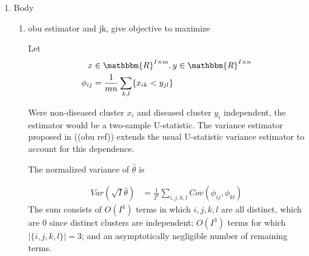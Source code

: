 \documentclass{article}
\newcommand{\V}{Var}
\newcommand{\cov}{Cov}
\newcommand{\I}{I}
\begin{document}
\begin{enumerate}
  ((obu ref)) presents an estimator of the variance of ((ref pop auc))
  enabling inferences to be drawn. Alternative estimators of the
  variance are resampling methods such as the bootstrap and the
  jackknife. Fig (()) presents a comparison of ((obu estimator)) and
  jackknife estimator using synthetic multivariate normal data. The
  two estimates are nearly identical. Fig (()) suggests that the
  difference of the two variance estimates is somewhere between
  $O(1/\I^2)$ and $O(1/\I^{2.5})$.

  Below we establish that the difference between the two variance
  estiamtors is $O(1/\I^2)$. We also give an adversarial example
  achieving this bound. Inasmuch as the jackknife may be viewed as a
  linearization of the bootstrap ((ref)), the result points to the
  bootstrap for carrying out inference in this setting ((
  ref model above )).

  
\item Body
  \begin{enumerate}
\item obu estimator and jk, give objective to maximize

  Let 
  \begin{align}
    x &\in \mathbbm{R}^{I\times m}, y \in \mathbbm{R}^{I\times n}\\
    \phi_{ij} &= \frac{1}{mn}\sum_{k,l}\{x_{ik}<y_{jl}\}\\
  \end{align}

  Were non-diseased cluster $x_i$ and diseased cluster $y_i$
  independent, the estimator would be a two-sample U-statistic. The
  variance estimator proposed in ((obu ref)) extends the usual
  U-statistic variance estimator to account for this dependence.

  The normalized variance of $\hat\theta$ is

  \begin{align}
    \V(\sqrt{\I}\hat\theta) &= \frac{1}{\I^3}\sum_{i,j,k,l}\cov(\phi_{ij},\phi_{kl})                                              
  \end{align}
  The sum consists of $O(\I^4)$ terms in which $i,j,k,l$ are all
  distinct, which are $0$ since distinct clusters are independent;
  $O(\I^3)$ terms for which $|\{i,j,k,l\}|=3$; and an asymptotically
  negligible number of remaining terms.


\end{enumerate}
\end{enumerate}
\end{document}
